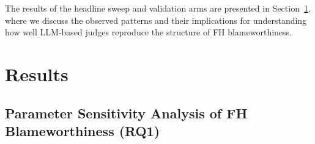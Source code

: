 \documentclass{article}
\begin{document}
The results of the headline sweep and validation arms are presented in Section~\ref{sec:results}, where we discuss the observed patterns and their implications for understanding how well LLM-based judges reproduce the structure of FH blameworthiness.

\section{Results}\label{sec:results}

\subsection{Parameter Sensitivity Analysis of FH Blameworthiness (RQ1)}


\end{document}

